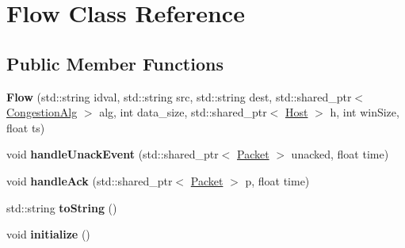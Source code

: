 \hypertarget{classFlow}{\section{\-Flow \-Class \-Reference}
\label{classFlow}
}
\subsection*{\-Public \-Member \-Functions}
\begin{DoxyCompactItemize}
\item 
\hypertarget{classFlow_aeb609967880d902a1f8ff8ad9db85862}{{\bfseries \-Flow} (std\-::string idval, std\-::string src, std\-::string dest, std\-::shared\-\_\-ptr$<$ \hyperlink{classCongestionAlg}{\-Congestion\-Alg} $>$ alg, int data\-\_\-size, std\-::shared\-\_\-ptr$<$ \hyperlink{classHost}{\-Host} $>$ h, int win\-Size, float ts)}\label{classFlow_aeb609967880d902a1f8ff8ad9db85862}

\item 
\hypertarget{classFlow_ad7f274b803ded1f3c5b1a4e24e477561}{void {\bfseries handle\-Unack\-Event} (std\-::shared\-\_\-ptr$<$ \hyperlink{classPacket}{\-Packet} $>$ unacked, float time)}\label{classFlow_ad7f274b803ded1f3c5b1a4e24e477561}

\item 
\hypertarget{classFlow_abb3e75cba1b777a083cfa5bae24c7af0}{void {\bfseries handle\-Ack} (std\-::shared\-\_\-ptr$<$ \hyperlink{classPacket}{\-Packet} $>$ p, float time)}\label{classFlow_abb3e75cba1b777a083cfa5bae24c7af0}

\item 
\hypertarget{classFlow_ae330545a178e3800aadb7c3f856b7b94}{std\-::string {\bfseries to\-String} ()}\label{classFlow_ae330545a178e3800aadb7c3f856b7b94}

\item 
\hypertarget{classFlow_a2fdad818f50e010c5db255abfc5138df}{void {\bfseries initialize} ()}\label{classFlow_a2fdad818f50e010c5db255abfc5138df}

\end{DoxyCompactItemize}
